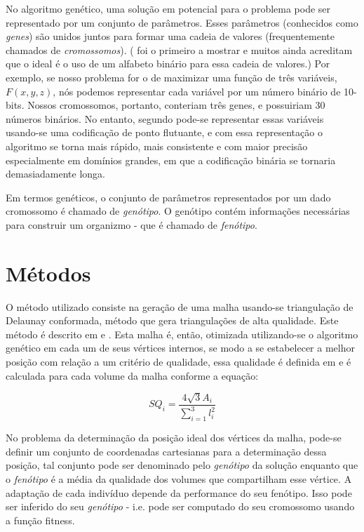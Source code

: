 \documentclass[review]{elsarticle}
\begin{document}
No algoritmo genético, uma solução em potencial para o problema pode ser representado por um conjunto de parâmetros. Esses parâmetros (conhecidos como \textit{genes}) são unidos juntos para formar uma cadeia de valores (frequentemente chamados de \textit{cromossomos}). (\cite{Holland1992} foi o primeiro a mostrar e muitos ainda acreditam que o ideal é o uso de um alfabeto binário para essa cadeia de valores.) Por exemplo, se nosso problema for o de maximizar uma função de três variáveis, $F(x,y,z)$, nós podemos representar cada variável por um número binário de 10-bits. Nossos cromossomos, portanto, conteriam três genes, e possuiriam 30 números binários. No entanto, segundo \cite{Janikow1991} pode-se representar essas variáveis usando-se uma codificação de ponto flutuante, e com essa representação o algoritmo se torna mais rápido, mais consistente e com maior precisão especialmente em domínios grandes, em que a codificação binária se tornaria demasiadamente longa.

Em termos genéticos, o conjunto de parâmetros representados por um dado cromossomo é chamado de \textit{genótipo}. O genótipo contém informações necessárias para construir um organizmo - que é chamado de \textit{fenótipo}.

\section{Métodos}

O método utilizado consiste na geração de uma malha usando-se triangulação de Delaunay conformada, método que gera triangulações de alta qualidade. Este método é descrito em \cite{Shewchuk2002} e \cite{Lin1996}. Esta malha é, então, otimizada utilizando-se o algoritmo genético em cada um de seus vértices internos, se modo a se estabelecer a melhor posição com relação a um critério de qualidade, essa qualidade é definida em \cite{Falsafioon2014} e é calculada para cada volume da malha conforme a equação:

\begin{equation}
    SQ_i = \frac{4 \sqrt{3} A_i}{\sum_{i=1}^3 l_i^2}
    \label{eq:01}
\end{equation}

No problema da determinação da posição ideal dos vértices da malha, pode-se definir um conjunto de coordenadas cartesianas para a determinação dessa posição, tal conjunto pode ser denominado pelo \textit{genótipo} da solução enquanto que o \textit{fenótipo} é a média da qualidade dos volumes que compartilham esse vértice. A adaptação de cada indivíduo depende da performance do seu fenótipo. Isso pode ser inferido do seu \textit{genótipo} - i.e. pode ser computado do seu cromossomo usando a função fitness.
\end{document}
